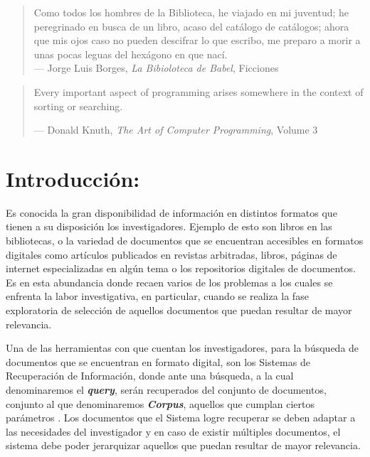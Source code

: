 \documentclass[
  10,
  openany]{book}
\begin{document}
\newpage
\thispagestyle{empty}
\vspace*{5cm}
\hfill
\begin{minipage}{0.70\textwidth}
\begin{quote}
Como todos los hombres de la Biblioteca, he viajado en mi juventud; he peregrinado en busca de un libro, acaso del catálogo de catálogos; ahora que mis ojos caso no pueden descifrar lo que escribo, me preparo a morir a unas pocas leguas del hexágono en que nací.\\
--- Jorge Luis Borges, \textit{La Bibioloteca de Babel}, Ficciones
\end{quote}
\hspace*{2cm}

\begin{quote}
Every important aspect of programming arises somewhere in the context of sorting or searching.

--- Donald Knuth, \textit{The Art of Computer Programming}, Volume 3
\end{quote}
\end{minipage}

\thispagestyle{empty}
\maketitle



{
\setcounter{tocdepth}{3}
\tableofcontents
}
\listoffigures
\listoftables
\clearpage
{}

\hypertarget{introduccion}{%
\chapter{Introducción:}\label{introduccion}}

Es conocida la gran disponibilidad de información en distintos formatos que tienen a su disposición los investigadores. Ejemplo de esto son libros en las bibliotecas, o la variedad de documentos que se encuentran accesibles en formatos digitales como artículos publicados en revistas arbitradas, libros, páginas de internet especializadas en algún tema o los repositorios digitales de documentos. Es en esta abundancia donde recaen varios de los problemas a los cuales se enfrenta la labor investigativa, en particular, cuando se realiza la fase exploratoria de selección de aquellos documentos que puedan resultar de mayor relevancia.

Una de las herramientas con que cuentan los investigadores, para la búsqueda de documentos que se encuentran en formato digital, son los Sistemas de Recuperación de Información, donde ante una búsqueda, a la cual denominaremos el \textbf{\emph{query}}, serán recuperados del conjunto de documentos, conjunto al que denominaremos \textbf{\emph{Corpus}}, aquellos que cumplan ciertos parámetros \citep{manning2008}. Los documentos que el Sistema logre recuperar se deben adaptar a las necesidades del investigador y en caso de existir múltiples documentos, el sistema debe poder jerarquizar aquellos que puedan resultar de mayor relevancia.
\end{document}

